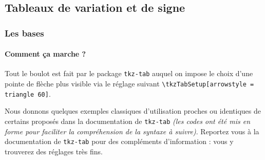 \documentclass[12pt,a4paper]{article}
\begin{document}

\subsection{Tableaux de variation et de signe}

\subsubsection{Les bases}

\paragraph{Comment ça marche ?}

Tout le boulot est fait par le package \verb+tkz-tab+ auquel on impose le choix d'une pointe de flèche plus visible via le réglage suivant \verb+\tkzTabSetup[arrowstyle = triangle 60]+.

\medskip

Nous donnons quelques exemples classiques d'utilisation proches ou identiques de certains proposés dans la documentation de \verb+tkz-tab+ \emph{(les codes ont été mis en forme pour faciliter la compréhension de la syntaxe à suivre)}.
Reportez vous à la documentation de \verb+tkz-tab+ pour des compléments d'information : vous y trouverez des réglages très fins.





\begin{latexex-flat}
\end{latexex-flat}





\begin{latexex-flat}
\end{latexex-flat}
\end{document}
